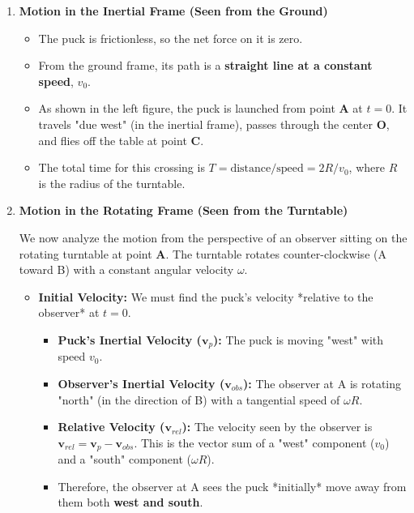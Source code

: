 \documentclass[11pt, a4paper]{article} %
\begin{document}
\begin{enumerate}
    \item \textbf{Motion in the Inertial Frame (Seen from the Ground)}
    \begin{itemize}
        \item The puck is frictionless, so the net force on it is zero.
        \item From the ground frame, its path is a \textbf{straight line at a constant speed}, $v_0$.
        \item As shown in the left figure, the puck is launched from point \textbf{A} at $t=0$. It travels "due west" (in the inertial frame), passes through the center \textbf{O}, and flies off the table at point \textbf{C}.
        \item The total time for this crossing is $T = \text{distance} / \text{speed} = 2R / v_0$, where $R$ is the radius of the turntable.
    \end{itemize}
    
    

    \item \textbf{Motion in the Rotating Frame (Seen from the Turntable)}
    
    We now analyze the motion from the perspective of an observer sitting on the rotating turntable at point \textbf{A}. The turntable rotates counter-clockwise (A toward B) with a constant angular velocity $\omega$.
    
    \begin{itemize}
        \item \textbf{Initial Velocity:} We must find the puck's velocity *relative to the observer* at $t=0$.
        \begin{itemize}
            \item \textbf{Puck's Inertial Velocity ($\mathbf{v}_p$):} The puck is moving "west" with speed $v_0$.
            \item \textbf{Observer's Inertial Velocity ($\mathbf{v}_{obs}$):} The observer at A is rotating "north" (in the direction of B) with a tangential speed of $\omega R$.
            \item \textbf{Relative Velocity ($\mathbf{v}_{rel}$):} The velocity seen by the observer is $\mathbf{v}_{rel} = \mathbf{v}_p - \mathbf{v}_{obs}$. This is the vector sum of a "west" component ($v_0$) and a "south" component ($\omega R$).
            \item Therefore, the observer at A sees the puck *initially* move away from them both \textbf{west and south}.
        \end{itemize}


\end{itemize}
\end{enumerate}
\end{document}
